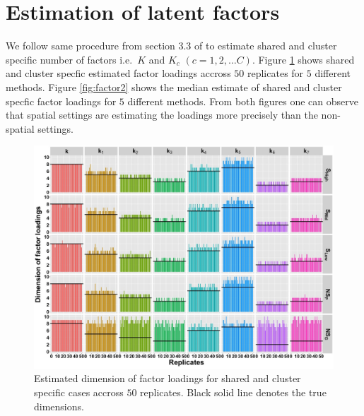\documentclass[
]{book}
\begin{document}
\hypertarget{estimation-of-latent-factors}{%
\section{Estimation of latent factors}\label{estimation-of-latent-factors}}

We follow same procedure from section 3.3 of \citet{de2018bayesian} to estimate shared and cluster specific number of factors i.e.~\(K\) and \(K_{c}\) \((c=1,2, \dots C)\). Figure \ref{fig:factor1} shows shared and cluster specfic estimated factor loadings accross \(50\) replicates for \(5\) different methods. Figure \ref{fig:factor2} shows the median estimate of shared and cluster specfic factor loadings for \(5\) different methods. From both figures one can observe that spatial settings are estimating the loadings more precisely than the non-spatial settings.

\begin{figure}

{\centering \includegraphics[width=0.8\linewidth]{images/Loading_Dimension_plot} 

}

\caption{Estimated dimension of factor loadings for shared and cluster specific cases accross $50$ replicates. Black solid line denotes the true dimensions.}\label{fig:factor1}
\end{figure}
\end{document}
